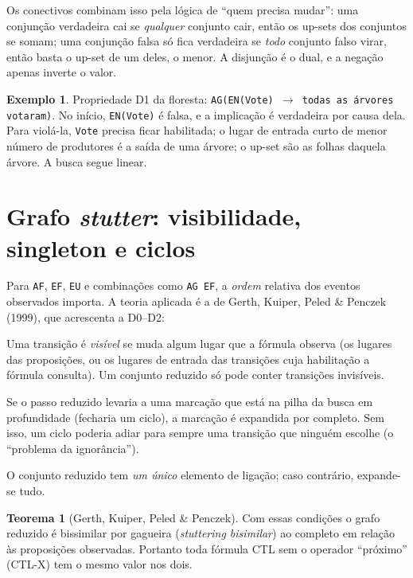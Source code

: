 \documentclass[11pt,a4paper]{report}
\newcommand{\code}[1]{\texttt{\small #1}}
\theoremstyle{definition}
\newtheorem{teorema}{Teorema}[chapter]
\newtheorem{exemplo}{Exemplo}[chapter]
\begin{document}
Os conectivos combinam isso pela lógica de ``quem precisa mudar'': uma
conjunção verdadeira cai se \emph{qualquer} conjunto cair, então os up-sets
dos conjuntos se somam; uma conjunção falsa só fica verdadeira se \emph{todo}
conjunto falso virar, então basta o up-set de um deles, o menor. A disjunção é
o dual, e a negação apenas inverte o valor.

\begin{exemplo}
Propriedade D1 da floresta: \code{AG(EN(Vote) $\to$ todas as árvores
votaram)}. No início, \code{EN(Vote)} é falsa, e a implicação é verdadeira
por causa dela. Para violá-la, \code{Vote} precisa ficar habilitada; o lugar
de entrada curto de menor número de produtores é a saída de uma árvore; o
up-set são as folhas daquela árvore. A busca segue linear.
\end{exemplo}

\section{Grafo \emph{stutter}: visibilidade, singleton e ciclos}

Para \code{AF}, \code{EF}, \code{EU} e combinações como \code{AG EF}, a
\emph{ordem} relativa dos eventos observados importa. A teoria aplicada é a de
Gerth, Kuiper, Peled \& Penczek (1999), que acrescenta a D0--D2:

\begin{description}[leftmargin=1.4em,font=\normalfont\bfseries]
  \item[C2 (visibilidade).] Uma transição é \emph{visível} se muda algum lugar
        que a fórmula observa (os lugares das proposições, ou os lugares de
        entrada das transições cuja habilitação a fórmula consulta). Um
        conjunto reduzido só pode conter transições invisíveis.
  \item[C3 (ciclo).] Se o passo reduzido levaria a uma marcação que está na
        pilha da busca em profundidade (fecharia um ciclo), a marcação é
        expandida por completo. Sem isso, um ciclo poderia adiar para sempre
        uma transição que ninguém escolhe (o ``problema da ignorância'').
  \item[C4 (singleton).] O conjunto reduzido tem \emph{um único} elemento de
        ligação; caso contrário, expande-se tudo.
\end{description}

\begin{teorema}[Gerth, Kuiper, Peled \& Penczek]
Com essas condições o grafo reduzido é bissimilar por gagueira
(\emph{stuttering bisimilar}) ao completo em relação às proposições
observadas. Portanto toda fórmula CTL sem o operador ``próximo'' (CTL-X) tem o
mesmo valor nos dois.
\end{teorema}
\end{document}

